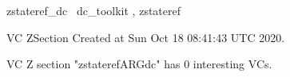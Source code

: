 \documentclass{article}
\begin{document}

\begin{zsection}	 \SECTION zstateref\_dc \parents~dc\_toolkit , zstateref
\end{zsection}

\newcommand{\appliesTo}{\zbinop{appliesTo}} 
\newcommand{\appliesToNofix}{\zpreop{appliesToNofix}} 

VC ZSection Created at Sun Oct 18 08:41:43 UTC 2020.



 VC Z section "zstaterefARGdc" has $0$ interesting VCs.



\end{document}
